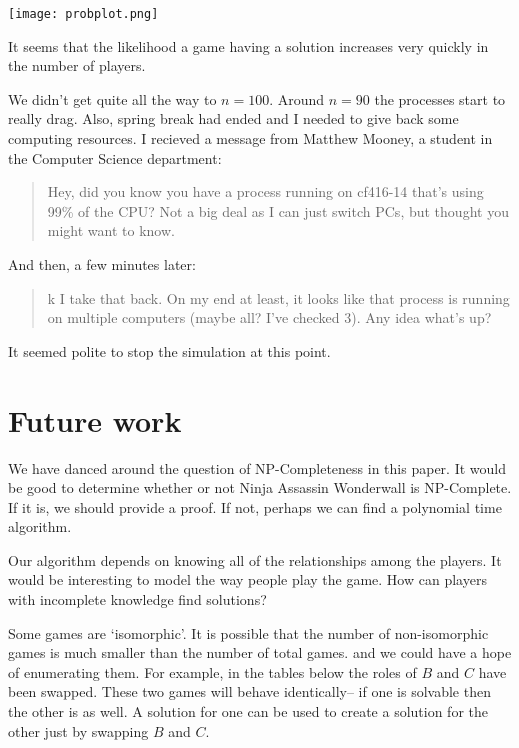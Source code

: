 \documentclass[12pt,x11names, rgb]{article}
\begin{document}
    \begin{center}
    \texttt{[image: probplot.png]}
    \end{center}

    It seems that the likelihood a game having a solution increases very quickly in the number of players.

    We didn't get quite all the way to $n=100$. Around $n=90$ the processes start to really drag. Also, spring break had ended and I needed to give back some computing resources. I recieved a message from Matthew Mooney, a student in the Computer Science department:
    \begin{quote}
    Hey, did you know you have a process running on cf416-14 that's using 99\% of the CPU? Not a big deal as I can just switch PCs, but thought you might want to know.
    \end{quote}
    And then, a few minutes later:
    \begin{quote}
    k I take that back. On my end at least, it looks like that process is running on multiple computers (maybe all? I've checked 3). Any idea what's up?
    \end{quote}

    It seemed polite to stop the simulation at this point.

\section{Future work}
    \label{sec:future-work}
    We have danced around the question of NP-Completeness in this paper. It would be good to determine whether or not Ninja Assassin Wonderwall is NP-Complete. If it is, we should provide a proof. If not, perhaps we can find a polynomial time algorithm.

    Our algorithm depends on knowing all of the relationships among the players. It would be interesting to model the way people play the game. How can players with incomplete knowledge find solutions?

    Some games are `isomorphic'. It is possible that the number of non-isomorphic games is much smaller than the number of total games. and we could have a hope of enumerating them. For example, in the tables below the roles of $B$ and $C$ have been swapped. These two games will behave identically-- if one is solvable then the other is as well. A solution for one can be used to create a solution for the other just by swapping $B$ and $C$.
\end{document}
